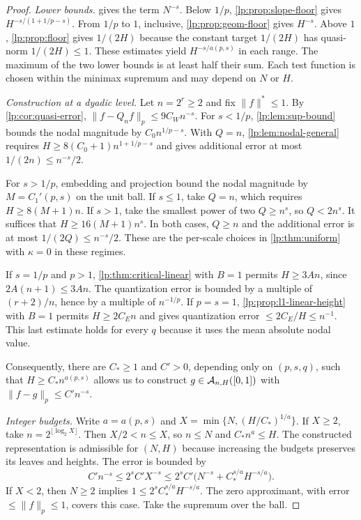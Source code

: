 \documentclass[11pt,a4paper]{article}
\begin{document}
\begin{proof}
\emph{Lower bounds.}  gives the term $N^{-s}$. Below $1/p$, \cref{lp:prop:slope-floor} gives $H^{-s/(1+1/p-s)}$. From $1/p$ to $1$, inclusive, \cref{lp:prop:geom-floor} gives $H^{-s}$. Above $1$, \cref{lp:prop:floor} gives $1/(2H)$ because the constant target $1/(2H)$ has quasi-norm $1/(2H)\le1$. These estimates yield $H^{-s/a(p,s)}$ in each range. The maximum of the two lower bounds is at least half their sum. Each test function is chosen within the minimax supremum and may depend on $N$ or $H$.

\emph{Construction at a dyadic level.} Let $n=2^r\ge2$ and fix $\|f\|^*\le1$. By \cref{lp:cor:quasi-error}, $\|f-Q_nf\|_p\le9C_W n^{-s}$. For $s<1/p$, \cref{lp:lem:sup-bound} bounds the nodal magnitude by $C_0n^{1/p-s}$. With $Q=n$, \cref{lp:lem:nodal-general} requires $H\ge8(C_0+1)n^{1+1/p-s}$ and gives additional error at most $1/(2n)\le n^{-s}/2$.

For $s>1/p$, embedding and projection bound the nodal magnitude by $M=C_1'(p,s)$ on the unit ball. If $s\le1$, take $Q=n$, which requires $H\ge8(M+1)n$. If $s>1$, take the smallest power of two $Q\ge n^s$, so $Q<2n^s$. It suffices that $H\ge16(M+1)n^s$. In both cases, $Q\ge n$ and the additional error is at most $1/(2Q)\le n^{-s}/2$. These are the per-scale choices in \cref{lp:thm:uniform} with $\kappa=0$ in these regimes.

If $s=1/p$ and $p>1$, \cref{lp:thm:critical-linear} with $B=1$ permits $H\ge3An$, since $2A(n+1)\le3An$. The quantization error is bounded by a multiple of $(r+2)/n$, hence by a multiple of $n^{-1/p}$. If $p=s=1$, \cref{lp:prop:l1-linear-height} with $B=1$ permits $H\ge2C_E n$ and gives quantization error $\le2C_E/H\le n^{-1}$. This last estimate holds for every $q$ because it uses the mean absolute nodal value.

Consequently, there are $C_*\ge1$ and $C'>0$, depending only on $(p,s,q)$, such that $H\ge C_*n^{a(p,s)}$ allows us to construct $g\in\mathcal A_{n,H}([0,1])$ with $\|f-g\|_p\le C'n^{-s}$.

\emph{Integer budgets.} Write $a=a(p,s)$ and $X=\min\{N,(H/C_*)^{1/a}\}$. If $X\ge2$, take $n=2^{\lfloor\log_2 X\rfloor}$. Then $X/2<n\le X$, so $n\le N$ and $C_*n^a\le H$. The constructed representation is admissible for $(N,H)$ because increasing the budgets preserves its leaves and heights. The error is bounded by
\[
 C'n^{-s}\le 2^s C'X^{-s}
 \le 2^s C'\bigl(N^{-s}+C_*^{s/a}H^{-s/a}\bigr).
\]
If $X<2$, then $N\ge2$ implies $1\le 2^s C_*^{s/a}H^{-s/a}$. The zero approximant, with error $\le\|f\|_p\le1$, covers this case. Take the supremum over the ball.
\end{proof}
\end{document}
